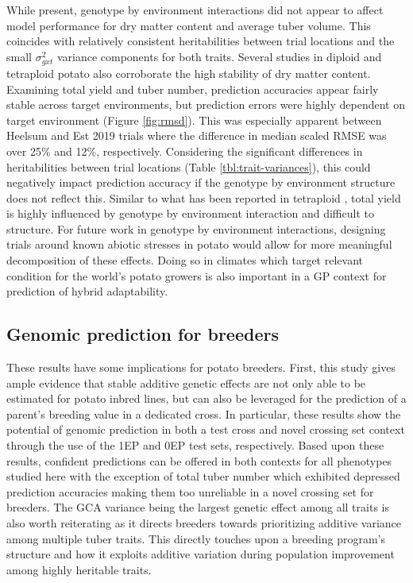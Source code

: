 \begin{refsection}
While present, genotype by environment interactions did not appear to affect model performance for dry matter content and average tuber volume. This coincides with relatively consistent heritabilities between trial locations and the small \(\sigma_{gxt}^2\) variance components for both traits. Several studies in diploid \parencite{Stockem2020} and tetraploid \parencite{Endelman2018, Cuevas2022, Ortiz2022, Wilson2023} potato also corroborate the high stability of dry matter content. Examining total yield and tuber number, prediction accuracies appear fairly stable across target environments, but prediction errors were highly dependent on target environment (Figure \ref{fig:rmsd}). This was especially apparent between Heelsum and Est 2019 trials where the difference in median scaled RMSE was over 25\% and 12\%, respectively. Considering the significant differences in heritabilities between trial locations (Table \ref{tbl:trait-variances}), this could negatively impact prediction accuracy if the genotype by environment structure does not reflect this. Similar to what has been reported in tetraploid \parencite{Cuevas2022, Ortiz2022, Wilson2023}, total yield is highly influenced by genotype by environment interaction and difficult to structure. For future work in genotype by environment interactions, designing trials around known abiotic stresses in potato would allow for more meaningful decomposition of these effects. Doing so in climates which target relevant condition for the world's potato growers is also important in a GP context for prediction of hybrid adaptability.

\subsection{Genomic prediction for breeders}

These results have some implications for potato breeders. First, this study gives ample evidence that stable additive genetic effects are not only able to be estimated for potato inbred lines, but can also be leveraged for the prediction of a parent's breeding value in a dedicated cross. In particular, these results show the potential of genomic prediction in both a test cross and novel crossing set context through the use of the 1EP and 0EP test sets, respectively. Based upon these results, confident predictions can be offered in both contexts for all phenotypes studied here with the exception of total tuber number which exhibited depressed prediction accuracies making them too unreliable in a novel crossing set for breeders. The GCA variance being the largest genetic effect among all traits is also worth reiterating as it directs breeders towards prioritizing additive variance among multiple tuber traits. This directly touches upon a breeding program's structure and how it exploits additive variation during population improvement among highly heritable traits. 


\end{refsection}
